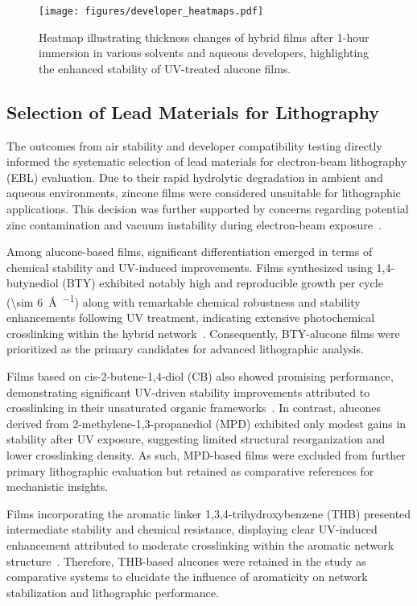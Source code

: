 \begin{figure}[ht]
  \centering
  \texttt{[image: figures/developer\_heatmaps.pdf]}
  \caption{Heatmap illustrating thickness changes of hybrid films after 1-hour immersion in various solvents and aqueous developers, highlighting the enhanced stability of UV-treated alucone films.}
  \label{fig:developer_heatmaps}
\end{figure}


\subsection{Selection of Lead Materials for Lithography}

The outcomes from air stability and developer compatibility testing directly informed the systematic selection of lead materials for electron-beam lithography (EBL) evaluation. Due to their rapid hydrolytic degradation in ambient and aqueous environments, zincone films were considered unsuitable for lithographic applications. This decision was further supported by concerns regarding potential zinc contamination and vacuum instability during electron-beam exposure~\cite{REF}.

Among alucone-based films, significant differentiation emerged in terms of chemical stability and UV-induced improvements. Films synthesized using 1,4-butynediol (BTY) exhibited notably high and reproducible growth per cycle (\SI{\sim 6}{\angstrom\per\cycle}) along with remarkable chemical robustness and stability enhancements following UV treatment, indicating extensive photochemical crosslinking within the hybrid network~\cite{REF}. Consequently, BTY-alucone films were prioritized as the primary candidates for advanced lithographic analysis.

Films based on cis-2-butene-1,4-diol (CB) also showed promising performance, demonstrating significant UV-driven stability improvements attributed to crosslinking in their unsaturated organic frameworks~\cite{REF}. In contrast, alucones derived from 2-methylene-1,3-propanediol (MPD) exhibited only modest gains in stability after UV exposure, suggesting limited structural reorganization and lower crosslinking density. As such, MPD-based films were excluded from further primary lithographic evaluation but retained as comparative references for mechanistic insights.

Films incorporating the aromatic linker 1,3,4-trihydroxybenzene (THB) presented intermediate stability and chemical resistance, displaying clear UV-induced enhancement attributed to moderate crosslinking within the aromatic network structure~\cite{REF}. Therefore, THB-based alucones were retained in the study as comparative systems to elucidate the influence of aromaticity on network stabilization and lithographic performance.

